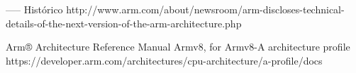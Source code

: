 
----- Histórico
http://www.arm.com/about/newsroom/arm-discloses-technical-details-of-the-next-version-of-the-arm-architecture.php

Arm® Architecture Reference Manual Armv8, for Armv8-A architecture profile
https://developer.arm.com/architectures/cpu-architecture/a-profile/docs

